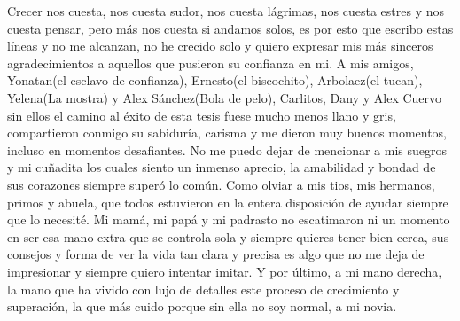 \begin{acknowledgements}
    
\end{acknowledgements}


Crecer nos cuesta, nos cuesta sudor, nos cuesta lágrimas, nos cuesta estres y nos cuesta pensar, pero más nos cuesta si andamos solos, es por esto que escribo 
estas líneas y no me alcanzan, no he crecido solo y quiero expresar mis más sinceros agradecimientos a aquellos que pusieron su confianza en mi. A mis amigos, 
Yonatan(el esclavo de confianza), Ernesto(el biscochito), Arbolaez(el tucan), Yelena(La mostra) y Alex Sánchez(Bola de pelo), Carlitos, Dany y Alex Cuervo sin 
ellos el camino al éxito de esta tesis fuese mucho menos llano y gris, compartieron conmigo su sabiduría, carisma y me dieron muy buenos momentos, incluso en 
momentos desafiantes. No me puedo dejar de mencionar a mis suegros y mi cuñadita los cuales siento un inmenso aprecio, la amabilidad y bondad de sus corazones 
siempre superó lo común. Como olviar a mis tios, mis hermanos, primos y abuela, que todos estuvieron en la entera disposición de ayudar siempre que lo necesité. 
Mi mamá, mi papá y mi padrasto no escatimaron ni un momento en ser esa mano extra que se controla sola y siempre quieres tener bien cerca, sus consejos y forma de 
ver la vida tan clara y precisa es algo que no me deja de impresionar y siempre quiero intentar imitar. Y por último, a mi mano derecha, la mano que ha vivido 
con lujo de detalles este proceso de crecimiento y superación, la que más cuido porque sin ella no soy normal, a mi novia.
